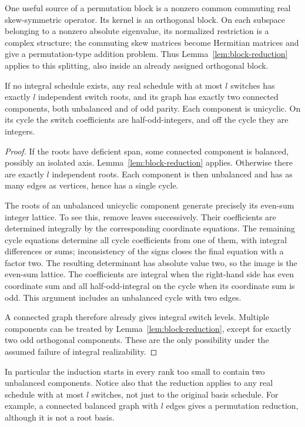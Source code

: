 One useful source of a permutation block is a nonzero common commuting
real skew-symmetric operator.  Its kernel is an orthogonal block.  On
each subspace belonging to a nonzero absolute eigenvalue, its normalized
restriction is a complex structure; the commuting skew matrices become
Hermitian matrices and give a permutation-type addition problem.  Thus
Lemma~\ref{lem:block-reduction} applies to this splitting, also inside an
already assigned orthogonal block.

\begin{lemma}\label{lem:hard-case}
If no integral schedule exists, any real schedule with at most \(l\)
switches has exactly \(l\) independent switch roots, and its graph has
exactly two connected components, both unbalanced and of odd parity.
Each component is unicyclic.  On its cycle the switch coefficients are
half-odd-integers, and off the cycle they are integers.
\end{lemma}

\begin{proof}
If the roots have deficient span, some connected component is balanced,
possibly an isolated axis.  Lemma~\ref{lem:block-reduction} applies.
Otherwise there are exactly \(l\) independent roots.  Each component is
then unbalanced and has as many edges as vertices, hence has a single
cycle.

The roots of an unbalanced unicyclic component generate precisely its
even-sum integer lattice.  To see this, remove leaves successively.
Their coefficients are determined integrally by the corresponding
coordinate equations.  The remaining cycle equations determine all
cycle coefficients from one of them, with integral differences or
sums; inconsistency of the signs closes the final equation with a
factor two.  The resulting determinant has absolute value two, so the
image is the even-sum lattice.  The coefficients are integral when the
right-hand side has even coordinate sum and all half-odd-integral on
the cycle when its coordinate sum is odd.  This argument includes an
unbalanced cycle with two edges.

A connected graph therefore already gives integral switch levels.
Multiple components can be treated by
Lemma~\ref{lem:block-reduction}, except for exactly two odd orthogonal
components.  These are the only possibility under the assumed failure
of integral realizability.
\end{proof}

In particular the induction starts in every rank too small to contain
two unbalanced components.  Notice also that the reduction applies to
any real schedule with at most \(l\) switches, not just to the original
basis schedule.  For example, a connected balanced graph with \(l\)
edges gives a permutation reduction, although it is not a root basis.

